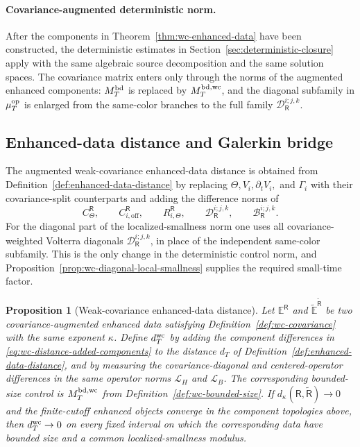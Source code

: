 \documentclass[10pt]{amsart}
\numberwithin{equation}{section}
\theoremstyle{plain}
\newtheorem{proposition}[theorem]{Proposition}
\theoremstyle{definition}
\theoremstyle{remark}
\begin{document}
\paragraph{Covariance-augmented deterministic norm.}
After the components in Theorem~\ref{thm:wc-enhanced-data} have been constructed, the deterministic estimates in Section~\ref{sec:deterministic-closure} apply with the same algebraic source decomposition and the same solution spaces.  The covariance matrix enters only through the norms of the augmented enhanced components: \(M_T^{\rm bd}\) is replaced by \(M_T^{\rm bd,wc}\), and the diagonal subfamily in \(\mu_T^{\rm op}\) is enlarged from the same-color branches to the full family \(\mathcal D_{\mathsf R}^{i;j,k}\).

\subsection{Enhanced-data distance and Galerkin bridge}
The augmented weak-covariance enhanced-data distance is obtained from Definition~\ref{def:enhanced-data-distance} by replacing $\Theta,V_i,\partial_tV_i,$ and $\Gamma_i$ with their covariance-split counterparts and adding the difference norms of
\begin{equation}\label{eq:wc-distance-added-components}
        C_\Theta^{\mathsf R},\qquad
        C_{i,\mathrm{off}}^{\mathsf R},\qquad
        R_{i,\Theta}^{\mathsf R},\qquad
        \mathcal D_{\mathsf R}^{i;j,k},\qquad
        \mathcal B_{\mathsf R}^{i;j,k}.
\end{equation}
For the diagonal part of the localized-smallness norm one uses all covariance-weighted Volterra diagonals \(\mathcal D_{\mathsf R}^{i;j,k}\), in place of the independent same-color subfamily.  This is the only change in the deterministic control norm, and Proposition~\ref{prop:wc-diagonal-local-smallness} supplies the required small-time factor.

\begin{proposition}[Weak-covariance enhanced-data distance]\label{prop:wc-enhanced-distance}
Let \(\mathbb E^{\mathsf R}\) and \(\widetilde{\mathbb E}^{\widetilde{\mathsf R}}\) be two covariance-augmented enhanced data satisfying Definition~\ref{def:wc-covariance} with the same exponent \(\kappa\).  Define \(d_T^{\rm wc}\) by adding the component differences in \eqref{eq:wc-distance-added-components} to the distance \(d_T\) of Definition~\ref{def:enhanced-data-distance}, and by measuring the covariance-diagonal and centered-operator differences in the same operator norms \(\mathcal L_H\) and \(\mathcal L_B\).  The corresponding bounded-size control is \(M_T^{\rm bd,wc}\) from Definition~\ref{def:wc-bounded-size}.  If \(d_\kappa(\mathsf R,\widetilde{\mathsf R})\to0\) and the finite-cutoff enhanced objects converge in the component topologies above, then \(d_T^{\rm wc}\to0\) on every fixed interval on which the corresponding data have bounded size and a common localized-smallness modulus.
\end{proposition}
\end{document}
